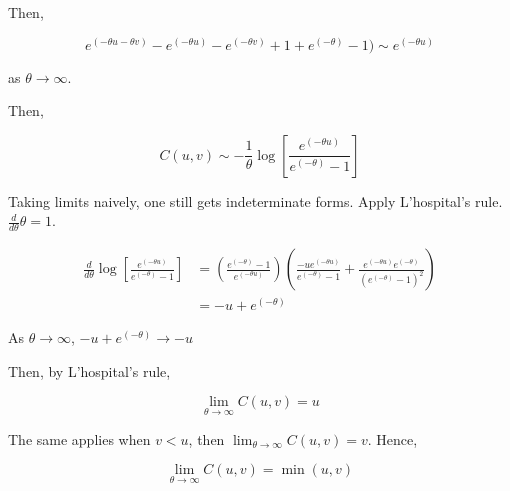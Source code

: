 \documentclass[11pt]{scrartcl}
\begin{document}
Then,

\[e^{(-\theta u -\theta v)} - e^{(-\theta u)} - e^{(-\theta v)} + 1 + e^{(-\theta)} - 1) \sim e^{(-\theta u)}\]

as $\theta \to \infty$.

Then,

\[C(u,v) \sim -\frac{1}{\theta} \log{\left[ \frac{e^{(-\theta u)}}{e^{(-\theta)} - 1} \right]}\]

Taking limits naively, one still gets indeterminate forms. Apply L'hospital's rule. $\frac{d}{d \theta} \theta = 1$.

\begin{align*}
\frac{d}{d\theta} \log{\left[ \frac{e^{(-\theta u)}}{e^{(-\theta)} - 1}\right]} &=  \left(\frac{e^{(-\theta)} - 1}{e^{(-\theta u)}}\right)\left( \frac{-ue^{(-\theta u)}}{e^{(-\theta)} - 1} + \frac{e^{(-\theta u)} e^{(-\theta)}}{(e^{(-\theta)} - 1)^2} \right) \\
&= -u + e^{(-\theta)}
\end{align*}

As $\theta \to \infty$, $-u + e^{(-\theta)} \to -u$

Then, by L'hospital's rule,

\[\lim_{\theta \to \infty} C(u,v) = u\]

The same applies when $v < u$, then $\lim_{\theta \to \infty} C(u,v) = v$. Hence,

\[\lim_{\theta \to \infty} C(u,v) = \min(u, v)\]
\end{document}
